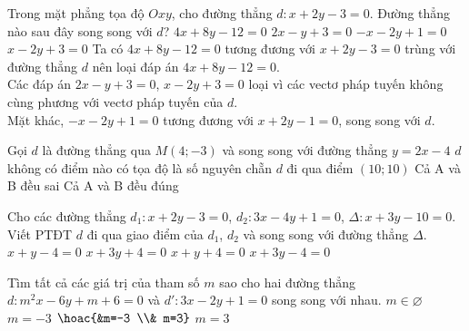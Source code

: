 	\begin{ex}%
		Trong mặt phẳng tọa độ $Oxy$, cho đường thẳng $d \colon x+2y-3=0$. Đường thẳng nào sau đây song song với $d$?
		\choice
		{$4x+8y-12=0$}
		{$2x-y+3=0$}
		{\True $-x-2y+1=0$}
		{$x-2y+3=0$}
		\loigiai
		{
			Ta có $4x+8y-12=0$ tương đương với $x+2y-3=0$ trùng với đường thẳng $d$ nên loại đáp án $4x+8y-12=0$.\\
			Các đáp án $2x-y+3=0$, $x-2y+3=0$ loại vì các vectơ pháp tuyến không cùng phương với vectơ pháp tuyến của $d$.\\
			Mặt khác, $-x-2y+1=0$ tương đương với $x+2y-1=0$, song song với $d$.
		}
	\end{ex}
	\begin{ex}%
		Gọi $d$ là đường thẳng qua $M(4;-3)$ và song song với đường thẳng $y=2x-4$
		\choice
		{\True $d$ không có điểm nào có tọa độ là số nguyên chẵn}
		{$d$ đi qua điểm $(10;10)$}
		{Cả A và B đều sai}
		{Cả A và B đều đúng}
	\end{ex}
	\begin{ex}%
		Cho các đường thẳng  $d_1 \colon x+2y-3=0$, $d_2 \colon 3x-4y+1=0$, $\Delta \colon x+3y-10=0$. Viết PTĐT $d$ đi qua giao điểm của $d_1$, $d_2$ và song song với đường thẳng $\Delta$.
		\choice
		{$x+y-4=0$}
		{$x+3y+4=0$}
		{$x+y+4=0$}
		{\True $x+3y-4=0$}
	\end{ex}
	\begin{ex}%
		Tìm tất cả các giá trị của tham số $m$ sao cho hai đường thẳng $d \colon m^2x-6y+m+6=0$ và $d' \colon 3x-2y+1=0$ song song với nhau.
		\choice
		{$m \in \varnothing$}
		{$m=-3$}
		{$\hoac{&m=-3 \\& m=3}$}
		{\True $m=3$}
	\end{ex}
